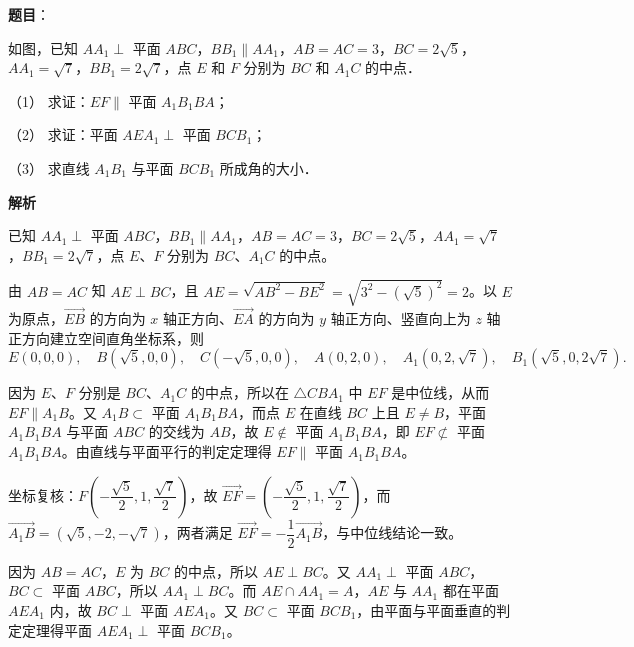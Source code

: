\begin{answer}

\textbf{题目}：

如图，已知 \(AA_1\perp\) 平面 \(ABC\)，\(BB_1\parallel AA_1\)，\(AB=AC=3\)，\(BC=2\sqrt{5}\)，\(AA_1=\sqrt{7}\)，\(BB_1=2\sqrt{7}\)，点 \(E\) 和 \(F\) 分别为 \(BC\) 和 \(A_1C\) 的中点．
\nopagebreak[4]
\begin{center}\end{center}
\nopagebreak[4]
（1） 求证：\(EF\parallel\) 平面 \(A_1B_1BA\)；

（2） 求证：平面 \(AEA_1\perp\) 平面 \(BCB_1\)；

（3） 求直线 \(A_1B_1\) 与平面 \(BCB_1\) 所成角的大小．

\textbf{解析}

已知 \(AA_1\perp\) 平面 \(ABC\)，\(BB_1\parallel AA_1\)，\(AB=AC=3\)，\(BC=2\sqrt{5}\)，\(AA_1=\sqrt{7}\)，\(BB_1=2\sqrt{7}\)，点 \(E\)、\(F\) 分别为 \(BC\)、\(A_1C\) 的中点。

由 \(AB=AC\) 知 \(AE\perp BC\)，且 \(AE=\sqrt{AB^{2}-BE^{2}}=\sqrt{3^{2}-(\sqrt{5})^{2}}=2\)。以 \(E\) 为原点，\(\overrightarrow{EB}\) 的方向为 \(x\) 轴正方向、\(\overrightarrow{EA}\) 的方向为 \(y\) 轴正方向、竖直向上为 \(z\) 轴正方向建立空间直角坐标系，则
\nopagebreak[4]
\[
E(0,0,0),\quad B(\sqrt{5},0,0),\quad C(-\sqrt{5},0,0),\quad A(0,2,0),\quad A_1(0,2,\sqrt{7}),\quad B_1(\sqrt{5},0,2\sqrt{7}).
\]

因为 \(E\)、\(F\) 分别是 \(BC\)、\(A_1C\) 的中点，所以在 \(\triangle CBA_1\) 中 \(EF\) 是中位线，从而 \(EF\parallel A_1B\)。又 \(A_1B\subset\) 平面 \(A_1B_1BA\)，而点 \(E\) 在直线 \(BC\) 上且 \(E\ne B\)，平面 \(A_1B_1BA\) 与平面 \(ABC\) 的交线为 \(AB\)，故 \(E\notin\) 平面 \(A_1B_1BA\)，即 \(EF\not\subset\) 平面 \(A_1B_1BA\)。由直线与平面平行的判定定理得 \(EF\parallel\) 平面 \(A_1B_1BA\)。

坐标复核：\(F\left(-\dfrac{\sqrt{5}}{2},1,\dfrac{\sqrt{7}}{2}\right)\)，故 \(\overrightarrow{EF}=\left(-\dfrac{\sqrt{5}}{2},1,\dfrac{\sqrt{7}}{2}\right)\)，而 \(\overrightarrow{A_1B}=(\sqrt{5},-2,-\sqrt{7})\)，两者满足 \(\overrightarrow{EF}=-\dfrac{1}{2}\overrightarrow{A_1B}\)，与中位线结论一致。

因为 \(AB=AC\)，\(E\) 为 \(BC\) 的中点，所以 \(AE\perp BC\)。又 \(AA_1\perp\) 平面 \(ABC\)，\(BC\subset\) 平面 \(ABC\)，所以 \(AA_1\perp BC\)。而 \(AE\cap AA_1=A\)，\(AE\) 与 \(AA_1\) 都在平面 \(AEA_1\) 内，故 \(BC\perp\) 平面 \(AEA_1\)。又 \(BC\subset\) 平面 \(BCB_1\)，由平面与平面垂直的判定定理得平面 \(AEA_1\perp\) 平面 \(BCB_1\)。


\end{answer}
